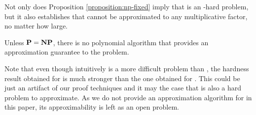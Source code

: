 Not only does Proposition \ref{proposition:np-fixed} imply that \prbrmfixed is an \np-hard problem, 
but it also establishes that \prbrmfixed cannot be approximated to any multiplicative factor, 
no matter how large.

\begin{corollary}
Unless $\textbf{P} = \textbf{NP}$, there is no polynomial 
algorithm
that provides an approximation guarantee
to the \prbrmfixed problem.
\end{corollary}

Note that even though intuitively 
\prbrm is a more difficult problem than \prbrmfixed, 
the hardness result obtained for \prbrmfixed is much stronger
than the one obtained for \prbrm.
This could be just an artifact of our proof techniques
and it may the case that \prbrm is also a hard problem to approximate. 
As we do not provide an approximation algorithm for \prbrm in this paper, 
its approximability is left as an open problem.



